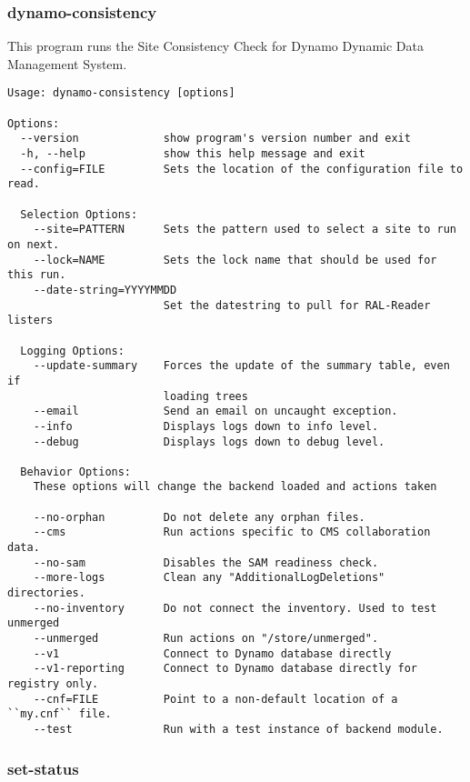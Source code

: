 \subsubsection{dynamo-consistency}

This program runs the Site Consistency Check for
Dynamo Dynamic Data Management System.
{\small
\begin{verbatim}
Usage: dynamo-consistency [options]

Options:
  --version             show program's version number and exit
  -h, --help            show this help message and exit
  --config=FILE         Sets the location of the configuration file to read.

  Selection Options:
    --site=PATTERN      Sets the pattern used to select a site to run on next.
    --lock=NAME         Sets the lock name that should be used for this run.
    --date-string=YYYYMMDD
                        Set the datestring to pull for RAL-Reader listers

  Logging Options:
    --update-summary    Forces the update of the summary table, even if
                        loading trees
    --email             Send an email on uncaught exception.
    --info              Displays logs down to info level.
    --debug             Displays logs down to debug level.

  Behavior Options:
    These options will change the backend loaded and actions taken

    --no-orphan         Do not delete any orphan files.
    --cms               Run actions specific to CMS collaboration data.
    --no-sam            Disables the SAM readiness check.
    --more-logs         Clean any "AdditionalLogDeletions" directories.
    --no-inventory      Do not connect the inventory. Used to test unmerged
    --unmerged          Run actions on "/store/unmerged".
    --v1                Connect to Dynamo database directly
    --v1-reporting      Connect to Dynamo database directly for registry only.
    --cnf=FILE          Point to a non-default location of a ``my.cnf`` file.
    --test              Run with a test instance of backend module.
\end{verbatim}
}

\subsubsection{set-status}

